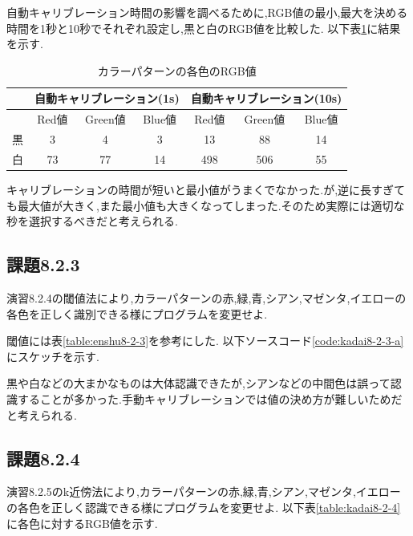 \documentclass{jarticle}
\begin{document}
自動キャリブレーション時間の影響を調べるために,RGB値の最小,最大を決める時間を1秒と10秒でそれぞれ設定し,黒と白のRGB値を比較した.
以下表\ref{table:kadai8-2-2}に結果を示す.
\begin{table}[H]
\caption{カラーパターンの各色のRGB値}
	\begin{center}
		\begin{tabular}{|c|c|c|c|c|c|c|}\hline 
			& \multicolumn{3}{c|}{自動キャリブレーション(1s)}&\multicolumn{3}{c|}{自動キャリブレーション(10s)} \\ \hline 
			& Red値 & Green値 & Blue値& Red値 & Green値 & Blue値 \\ \hline
		黒 & 3 & 4 & 3 & 13 & 88 & 14 \\	 \hline
		白 & 73& 77& 14& 498& 506& 55\\ \hline 
		\end{tabular}
	\end{center}
\label{table:kadai8-2-2} 
\end{table}

キャリブレーションの時間が短いと最小値がうまくでなかった.が,逆に長すぎても最大値が大きく,また最小値も大きくなってしまった.そのため実際には適切な秒を選択するべきだと考えられる.
\subsection{課題8.2.3}\label{subsec:kadai8-2-3}
演習8.2.4の閾値法により,カラーパターンの赤,緑,青,シアン,マゼンタ,イエローの各色を正しく識別できる様にプログラムを変更せよ.

閾値には表\ref{table:enshu8-2-3}を参考にした.
以下ソースコード\ref{code:kadai8-2-3-a}にスケッチを示す.



黒や白などの大まかなものは大体認識できたが,シアンなどの中間色は誤って認識することが多かった.手動キャリブレーションでは値の決め方が難しいためだと考えられる.

\subsection{課題8.2.4}\label{subsec:kadai8-2-4}
演習8.2.5のk近傍法により,カラーパターンの赤,緑,青,シアン,マゼンタ,イエローの各色を正しく認識できる様にプログラムを変更せよ.
以下表\ref{table:kadai8-2-4}に各色に対するRGB値を示す.
\end{document}
